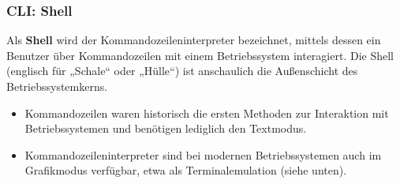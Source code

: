\subsubsection*{CLI: Shell}
Als \textbf{Shell} wird der Kommandozeileninterpreter bezeichnet, mittels dessen ein Benutzer über Kommandozeilen mit einem Betriebssystem interagiert. Die Shell (englisch für „Schale“ oder „Hülle“) ist anschaulich die Außenschicht des Betriebssystemkerns.
\begin{itemize}
	\item Kommandozeilen waren historisch die ersten Methoden zur Interaktion mit Betriebssystemen und benötigen lediglich den Textmodus.
	\item Kommandozeileninterpreter sind bei modernen Betriebssystemen auch im Grafikmodus verfügbar, etwa als Terminalemulation (siehe unten).
\end{itemize}

